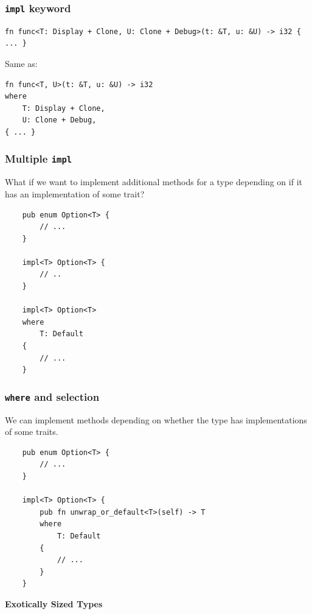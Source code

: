 \documentclass[aspectratio=1610,t]{beamer}
\begin{document}

\begin{frame}[fragile]
\frametitle{\texttt{impl} keyword}
\begin{verbatim}
fn func<T: Display + Clone, U: Clone + Debug>(t: &T, u: &U) -> i32 { ... }
\end{verbatim}
Same as:
\begin{verbatim}
fn func<T, U>(t: &T, u: &U) -> i32
where
    T: Display + Clone,
    U: Clone + Debug,
{ ... }
\end{verbatim}

\end{frame}


\begin{frame}[fragile]
\frametitle{Multiple \texttt{impl}}
What if we want to implement additional methods for a type depending on if it has an implementation of some trait?

\begin{verbatim}
    pub enum Option<T> {
        // ...
    }

    impl<T> Option<T> {
        // ..
    }

    impl<T> Option<T>
    where
        T: Default
    {
        // ...
    }
\end{verbatim}
\end{frame}


\begin{frame}[fragile]
\frametitle{\texttt{where} and selection}
We can implement methods depending on whether the type has implementations of some traits.

\begin{verbatim}
    pub enum Option<T> {
        // ...
    }

    impl<T> Option<T> {
        pub fn unwrap_or_default<T>(self) -> T
        where
            T: Default
        {
            // ...
        }
    }
\end{verbatim}
\end{frame}


\begin{frame}[c]
\centering\Huge\textbf{Exotically Sized Types}
\end{frame}
\end{document}
